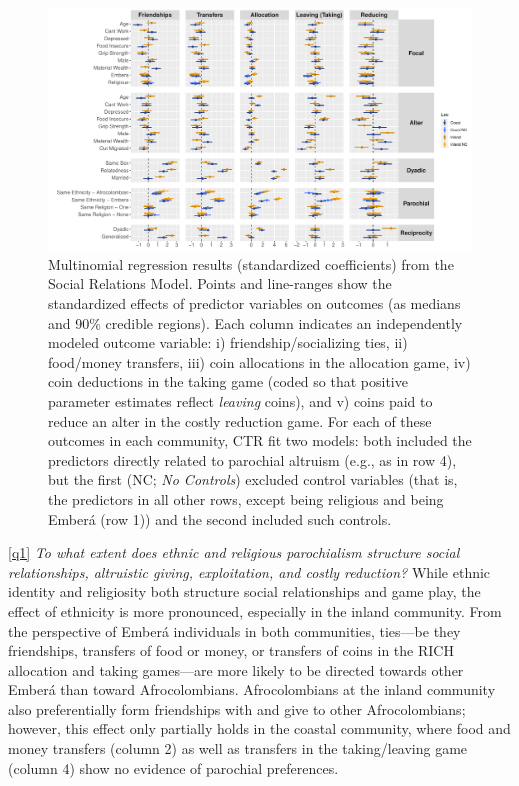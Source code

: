 \documentclass[bibauthoryear]{aa}
\begin{document}
 \begin{figure}[t]
 \centering
\includegraphics[width=6.5 in]{All_Games-Standardized_SRM} %
\caption{{\footnotesize Multinomial regression results (standardized coefficients) from the Social Relations Model. Points and line-ranges show the standardized effects of predictor variables on outcomes (as medians and 90\% credible regions). Each column indicates an independently modeled outcome variable: i) friendship/socializing ties, ii) food/money transfers, iii) coin allocations in the allocation game, iv) coin deductions in the taking game (coded so that positive parameter estimates reflect \textit{leaving} coins), and v) coins paid to reduce an alter in the costly reduction game. For each of these outcomes in each community, CTR fit two models: both included the predictors directly related to parochial altruism (e.g., as in row 4), but the first (NC; \textit{No Controls}) excluded control variables (that is, the predictors in all other rows, except being religious and being Ember\'a (row 1)) and the second included such controls. }
} \label{colombianres}
\end{figure}

\ref{q1} \emph{To what extent does ethnic and religious parochialism structure social relationships, altruistic giving, exploitation, and costly reduction?} While ethnic identity and religiosity both structure social relationships and game play, the effect of ethnicity is more pronounced, especially in the inland community. From the perspective of Ember\'a individuals in both communities, ties---be they friendships, transfers of food or money, or transfers of coins in the RICH allocation and taking games---are more likely to be directed towards other Ember\'a than toward Afrocolombians. Afrocolombians at the inland community also preferentially form friendships with and give to other Afrocolombians; however, this effect only partially holds in the coastal community, where food and money transfers (column 2) as well as transfers in the taking/leaving game (column 4) show no evidence of parochial preferences.
\end{document}
